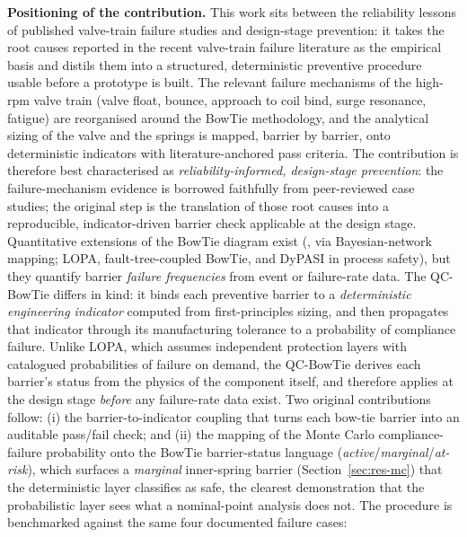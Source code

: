 \noindent\textbf{Positioning of the contribution.} This work
sits between the reliability lessons of published valve-train
failure studies and design-stage prevention: it takes the root causes reported in the
recent valve-train failure literature
\citep{velezgodino2019overheadvalvetrain,soffritti2018wornvalvetrain,xing2021valvespringEAC,zhao2023camshaftV6}
as the empirical basis and distils them into a structured,
deterministic preventive procedure usable before a prototype is
built. The relevant failure mechanisms of the high-rpm valve train
(valve float, bounce, approach to coil bind, surge resonance,
fatigue) are reorganised around the BowTie methodology, and the
analytical sizing of the valve and the springs is mapped, barrier
by barrier, onto deterministic indicators with literature-anchored
pass criteria. The contribution is therefore best characterised as
\emph{reliability-informed, design-stage prevention}: the
failure-mechanism evidence is borrowed faithfully from
peer-reviewed case studies; the original step is the
translation of those root causes into a reproducible,
indicator-driven barrier check applicable at the design stage.
Quantitative extensions of the BowTie diagram exist
(\citealp{khakzad2013bowtiebayesian}, via Bayesian-network mapping;
LOPA, fault-tree-coupled BowTie, and DyPASI in process safety), but they
quantify barrier \emph{failure frequencies} from event or failure-rate
data. The QC-BowTie differs in kind: it binds each preventive barrier to
a \emph{deterministic engineering indicator} computed from
first-principles sizing, and then propagates that indicator through its
manufacturing tolerance to a probability of compliance failure. Unlike
LOPA, which assumes independent protection layers with catalogued
probabilities of failure on demand, the QC-BowTie derives each
barrier's status from the physics of the component itself, and therefore
applies at the design stage \emph{before} any failure-rate data exist.
Two original contributions follow: (i) the barrier-to-indicator
coupling that turns each bow-tie barrier into an auditable pass/fail
check; and (ii) the mapping of the Monte Carlo compliance-failure
probability onto the BowTie barrier-status language
(\emph{active}/\emph{marginal}/\emph{at-risk}), which surfaces a
\emph{marginal} inner-spring barrier
(Section~\ref{sec:res-mc}) that the deterministic layer classifies as
safe, the clearest demonstration that the probabilistic layer sees
what a nominal-point analysis does not. The procedure is
benchmarked against the same four documented failure cases:
